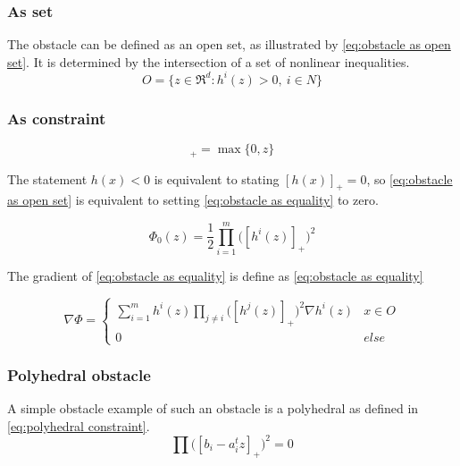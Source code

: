 			\subsubsection{As set}
				 The obstacle can be defined as an open set, as illustrated by \eqref{eq:obstacle as open set}. It is determined by the intersection of a set of nonlinear inequalities.
				\begin{equation}
					O = \{ z \in \Re^d : h^i(z)>0,\ i \in N \}
					\label{eq:obstacle as open set}
				\end{equation}
				
			\subsubsection{As constraint}
				\begin{equation}
					[z]_+ =  \max\{0,z\}
				\end{equation}
				
				The statement $h(x)<0$ is equivalent to stating $[h(x)]_+=0$, so \eqref{eq:obstacle as open set} is equivalent to setting \eqref{eq:obstacle as equality} to zero.
				
				\begin{equation}
					\Phi_0(z) =  \frac{1}{2} \prod_{i=1}^m \Big( [h^i(z)]_+ \Big)^2
					\label{eq:obstacle as equality}
				\end{equation}
				
				The gradient of \eqref{eq:obstacle as equality} is define as \eqref{eq:obstacle as equality}
				
				\begin{equation}
					\nabla \Phi =
					\begin{cases}
						\sum_{i=1}^{m} h^i(z)\prod_{j \ne i} \Big( [h^j(z)]_+ \Big)^2 \nabla h^i(z)
						& x \in O \\
						0 & else
					\end{cases}
					\label{eq:derivative obstacle as equality}
				\end{equation}
			
			\subsubsection{Polyhedral obstacle}
				A simple obstacle example of such an obstacle is a polyhedral as defined in \eqref{eq:polyhedral constraint}.
				\begin{equation}
					\prod \Big([b_i - a_i^t z]_+ \Big)^2 = 0
					\label{eq:polyhedral constraint}
				\end{equation}
			
